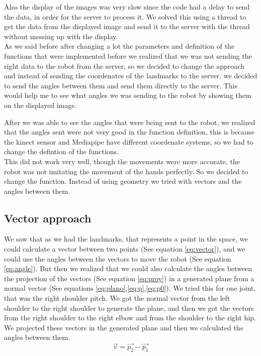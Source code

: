 \documentclass[conference]{IEEEtran}
\begin{document}
Also the display of the images was very slow since the code had a delay to send the data, in order for the server to process it. We solved this using a thread to get the data from the displayed image and send it to the server with the thread without messing up with the display.
\\
As we said before after changing a lot the parameters and definition of the functions that were implemented before we realized that we was not sending the right data to the robot from the server, so we decided to change the approach and instead of sending the coordenates of the landmarks to the server, we decided to send the angles between them and send them directly to the server. This would help me to see what angles we was sending to the robot by showing them on the displayed image.

After we was able to see the angles that were being sent to the robot, we realized that the angles sent were not very good in the function definition, this is because the kinect sensor and Mediapipe have different coordenate systems, so we had to change the defintion of the functions.
\\
This did not work very well, though the movements were more accurate, the robot was not imitating the movement of the hands perfectly. So we decided to change the function. Instead of using geometry we tried with vectors and the angles between them.

\subsection{Vector approach}
We saw that as we had the landmarks, that represents a point in the space, we could calculate a vector between two points (See equation \ref{eq:vector}), and we could use the angles between the vectors to move the robot (See equation \ref{eq:angle}). But then we realized that we could also calculate the angles between the projection of the vectors (See equation \ref{eq:proy}) in a generated plane from a normal vector (See equations \ref{eq:plano},\ref{eq:p},\ref{eq:p0}). We tried this for one joint, that was the right shoulder pitch. We got the normal vector from the left shoulder to the right shoulder to generate the plane, and then we got the vectors from the right shoulder to the right elbow and from the shoulder to the right hip. We projected these vectors in the generated plane and then we calculated the angles between them. 
\begin{equation}\label{eq:vector}
    \vec{v} = \vec{p_2} - \vec{p_1}
\end{equation}
\end{document}
